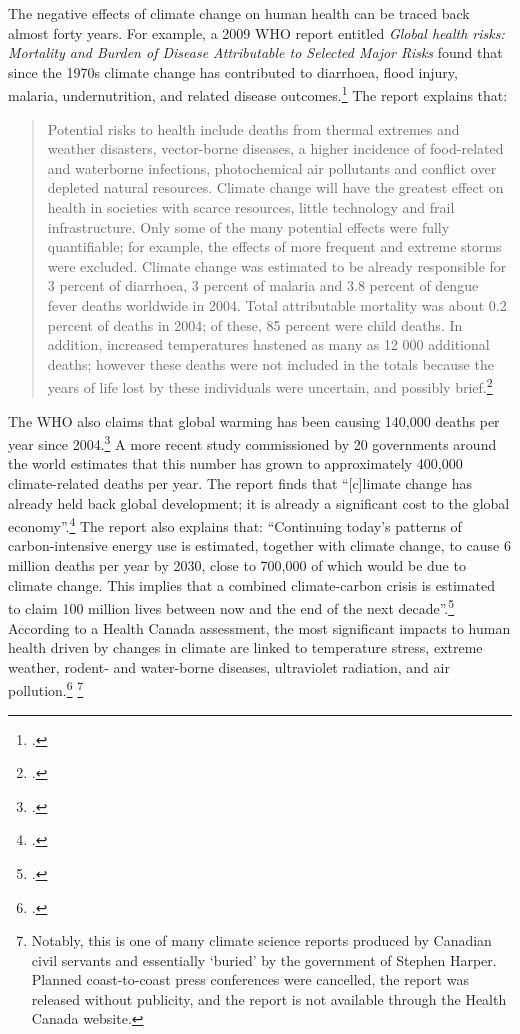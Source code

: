 \documentclass[10pt]{article}
\begin{document}
The negative effects of climate change on human health can be traced back almost forty years. 
For example, a 2009 WHO report entitled \emph{Global health risks: Mortality and Burden of Disease Attributable to Selected Major Risks} found that since the 1970s climate change has contributed to diarrhoea, flood injury, malaria, undernutrition, and related disease outcomes.\footcite[][p. 44]{WHOGlobalHealthRisks}
The report explains that:
\begin{quote}
Potential risks to health include deaths from thermal extremes and weather disasters, vector-borne diseases, a higher incidence of food-related and waterborne infections, photochemical air pollutants and conflict over depleted natural resources. Climate change will have the greatest effect on health in societies with scarce resources, little technology and frail infrastructure. Only some of the many potential effects were fully quantifiable; for example, the effects of more frequent and extreme storms were excluded. Climate change was estimated to be already responsible for 3 percent of diarrhoea, 3 percent of malaria and 3.8 percent of dengue fever deaths worldwide in 2004. Total attributable mortality was about 0.2 percent of deaths in 2004; of these, 85 percent were child deaths. In addition, increased temperatures hastened as many as 12 000 additional deaths; however these deaths were not included in the totals because the years of life lost by these individuals were uncertain, and possibly brief.\footcite[][p. 24]{WHOGlobalHealthRisks}
\end{quote}
The WHO also claims that global warming has been causing 140,000 deaths per year since 2004.\footcite[][]{WHOCCandHealth2012}
A more recent study commissioned by 20 governments around the world estimates that this number has grown to approximately 400,000 climate-related deaths per year.
The report finds that ``[c]limate change has already held back global development; it is already a significant cost to the global economy''.\footcite[][p. 16]{DARACVM}
The report also explains that: ``Continuing today's patterns of carbon-intensive energy use is estimated, together with climate 
change, to cause 6 million deaths per year by 2030, close to 700,000 of which would be due to climate change. This implies that a combined climate-carbon crisis is estimated to claim 100 million lives between now and the end of the next decade''.\footcite[][p. 17]{DARACVM}
According to a Health Canada assessment, the most significant impacts to human health driven by changes in climate are linked to temperature stress, extreme weather, rodent- and water-borne diseases, ultraviolet radiation, and air pollution.\footcite[][]{HHInACC} \footnote{Notably, this is one of many climate science reports produced by Canadian civil servants and essentially `buried' by the government of Stephen Harper. Planned coast-to-coast press conferences were cancelled, the report was released without publicity, and the report is not available through the Health Canada website.}
\end{document}
